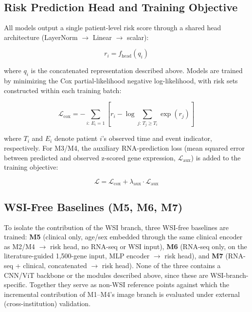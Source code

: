 \subsection{Risk Prediction Head and Training Objective}
\label{subsec:risk-head}

All models output a single patient-level risk score through a shared head
architecture (LayerNorm $\rightarrow$ Linear $\rightarrow$ scalar):

\begin{equation}
  r_i = f_{\mathrm{head}}(q_i)
\end{equation}

where $q_i$ is the concatenated representation described above. Models are trained by
minimizing the Cox partial-likelihood negative log-likelihood, with risk sets
constructed within each training batch:

\begin{equation}
  \mathcal{L}_{\mathrm{cox}} = -\sum_{i:\, E_i = 1} \left[ r_i - \log \sum_{j:\, T_j \geq T_i} \exp(r_j) \right]
\end{equation}

where $T_i$ and $E_i$ denote patient $i$'s observed time and event indicator,
respectively. For M3/M4, the auxiliary RNA-prediction loss (mean squared error
between predicted and observed z-scored gene expression, $\mathcal{L}_{\mathrm{aux}}$)
is added to the training objective:

\begin{equation}
  \mathcal{L} = \mathcal{L}_{\mathrm{cox}} + \lambda_{\mathrm{aux}} \cdot \mathcal{L}_{\mathrm{aux}}
\end{equation}

\subsection{WSI-Free Baselines (M5, M6, M7)}
\label{subsec:wsi-free}

To isolate the contribution of the WSI branch, three WSI-free baselines are
trained: \textbf{M5} (clinical only, age/sex embedded through the same clinical
encoder as M2/M4 $\rightarrow$ risk head, no RNA-seq or WSI input), \textbf{M6}
(RNA-seq only, on the literature-guided 1,500-gene input, MLP encoder
$\rightarrow$ risk head), and \textbf{M7} (RNA-seq + clinical, concatenated
$\rightarrow$ risk head). None of the three contains a CNN/ViT backbone or the modules described above, since these are
WSI-branch-specific. Together they serve as non-WSI reference points against
which the incremental contribution of M1--M4's image branch is evaluated under
external (cross-institution) validation.